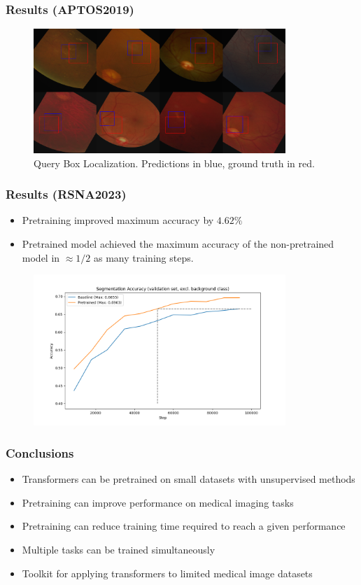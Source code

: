 \documentclass{beamer}
\begin{document}
\begin{frame}
   \frametitle{Results (APTOS2019)}
   \begin{figure}
       \centering
       \includegraphics[width=0.85\textwidth]{box_pred.png}
       \caption{Query Box Localization. Predictions in blue, ground truth in red.}
   \end{figure}
\end{frame}

\begin{frame}
   \frametitle{Results (RSNA2023)}
   \begin{itemize}
        \item Pretraining improved maximum accuracy by $4.62\%$
        \item Pretrained model achieved the maximum accuracy of the non-pretrained model in $\approx1/2$ as many training steps.
   \end{itemize}
   \begin{figure}
       \centering
       \includegraphics[width=0.85\textwidth]{segmentation_results.png}
   \end{figure}
\end{frame}

\begin{frame}
   \frametitle{Conclusions}
   \begin{itemize}
        \item Transformers can be pretrained on small datasets with unsupervised methods
        \item Pretraining can improve performance on medical imaging tasks
        \item Pretraining can reduce training time required to reach a given performance
        \item Multiple tasks can be trained simultaneously
        \item Toolkit for applying transformers to limited medical image datasets
   \end{itemize}
\end{frame}
\end{document}
